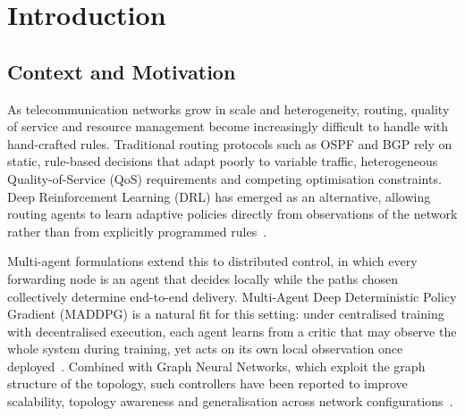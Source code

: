 
%

\chapter{Introduction}
\label{cha:introduction}


\epigraphfontsize{\small\itshape}
\setlength\epigraphwidth{12.5cm}
\setlength\epigraphrule{0pt}

\section{Context and Motivation}
\label{sec:intro_context}

As telecommunication networks grow in scale and heterogeneity, routing, quality of
service and resource management become increasingly difficult to handle with
hand-crafted rules. Traditional routing protocols such as OSPF and BGP rely on static,
rule-based decisions that adapt poorly to variable traffic, heterogeneous
Quality-of-Service (QoS) requirements and competing optimisation constraints. Deep
Reinforcement Learning (DRL) has emerged as an alternative, allowing routing agents to
learn adaptive policies directly from observations of the network rather than from
explicitly programmed rules~\cite{Tian2023maddpgslice}.

Multi-agent formulations extend this to distributed control, in which every forwarding
node is an agent that decides locally while the paths chosen collectively determine
end-to-end delivery. Multi-Agent Deep Deterministic Policy Gradient (MADDPG) is a
natural fit for this setting: under centralised training with decentralised execution,
each agent learns from a critic that may observe the whole system during training, yet
acts on its own local observation once deployed~\cite{lowe2017multi}. Combined with
Graph Neural Networks, which exploit the graph structure of the topology, such
controllers have been reported to improve scalability, topology awareness and
generalisation across network
configurations~\cite{Almasan_2022,wang2024multi,huang2025era,9974607,zhang2025dramadynamicpacketrouting,11134361}.


